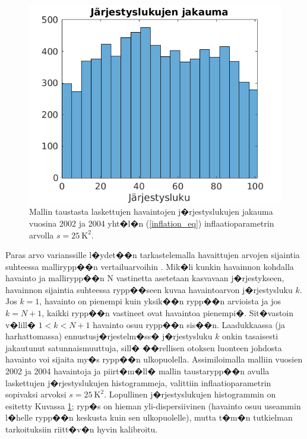\documentclass[12pt,a4paper,finnish,margin=2in]{article}
\begin{document}
\begin{figure}[t]
\centering
\includegraphics[scale = 0.6]{gradu_jarjestys}
\caption{Mallin taustasta laskettujen havaintojen j�rjestyslukujen jakauma vuosina 2002 ja 2004 yht�l�n (\ref{inflation_eq}) inflaatioparametrin arvolla $s = 25~\mathrm{K}^2$.}
\label{fig:rank}
\end{figure}

Paras arvo varianssille l�ydet��n tarkastelemalla havaittujen arvojen sijaintia suhteessa mallirypp��n vertailuarvoihin \citep{hamill_2001b, jarvinen_2015}. Mik�li kunkin havainnon kohdalla havainto ja mallirypp��n N vastinetta asetetaan kasvavaan j�rjestykseen, havainnon sijaintia suhteessa rypp��seen kuvaa havaintoarvon j�rjestysluku $k$. Jos $k = 1$, havainto on pienempi kuin yksik��n rypp��n arvioista ja jos $k = N + 1$, kaikki rypp��n vastineet ovat havaintoa pienempi�. Sit�vastoin v�lill� $1 < k < N+1$ havainto osuu rypp��n sis��n. Laadukkaassa (ja harhattomassa) ennustusj�rjestelm�ss� j�rjestysluku $k$ onkin tasaisesti jakautunut satunnaismuuttuja, sill� ��rellisen otoksen luonteen johdosta havainto voi sijaita my�s rypp��n ulkopuolella. Assimiloimalla malliin vuosien 2002 ja 2004 havaintoja ja piirt�m�ll� mallin taustarypp��n avulla laskettujen j�rjestyslukujen histogrammeja, valittiin inflaatioparametrin sopivaksi arvoksi $s= 25~\mathrm{K}^2$. Lopullinen j�rjestyslukujen histogrammin on esitetty Kuvassa \ref{fig:rank}; ryp�s on hieman yli-dispersiivinen (havainto osuu useammin l�helle rypp��n keskusta kuin sen ulkopuolelle), mutta t�m�n tutkielman tarkoituksiin riitt�v�n hyvin kalibroitu. 
\end{document}
